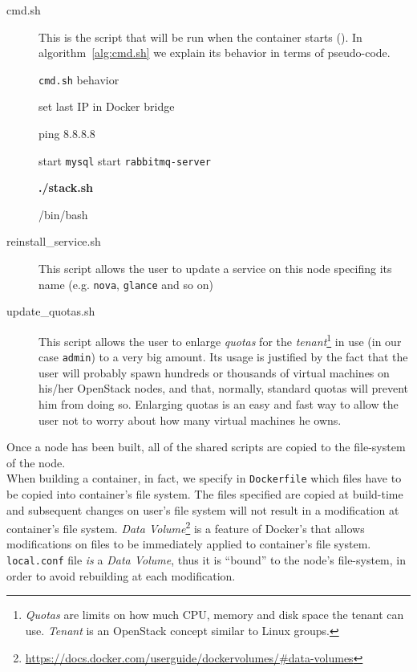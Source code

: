 \begin{description}
	\item[cmd.sh] This is the script that will be run when the container starts (). In algorithm~\ref{alg:cmd.sh} we explain its behavior in terms of pseudo-code.
	\begin{algorithm}[H]
	\caption{\texttt{cmd.sh} behavior}
	\label{alg:cmd.sh}
	\begin{algorithmic}[0]
			\State set last IP in Docker bridge 
		\EndIf

		\State ping 8.8.8.8 

			\State start \texttt{mysql}
			\State start \texttt{rabbitmq-server}
		\EndIf

		\State \textbf{./stack.sh} 

		\State /bin/bash 
	\end{algorithmic}
	\end{algorithm}
	
	\item[reinstall\_service.sh] This script allows the user to update a service on this node specifing its name (e.g. \texttt{nova}, \texttt{glance} and so on)

	\item[update\_quotas.sh] This script allows the user to enlarge \textit{quotas} for the \textit{tenant}\footnote{\textit{Quotas} are limits on how much CPU, memory and disk space the tenant can use. \textit{Tenant} is an OpenStack concept similar to Linux groups.} in use (in our case \texttt{admin}) to a very big amount. Its usage is justified by the fact that the user will probably spawn hundreds or thousands of virtual machines on his/her OpenStack nodes, and that, normally, standard quotas will prevent him from doing so. Enlarging quotas is an easy and fast way to allow the user not to worry about how many virtual machines he owns.
\end{description}

Once a node has been built, all of the shared scripts are copied to the file-system of the node.\\
When building a container, in fact, we specify in \texttt{Dockerfile} which files have to be copied into container's file system. The files specified are copied at build-time and subsequent changes on user's file system will not result in a modification at container's file system. \textit{Data Volume}\footnote{\url{https://docs.docker.com/userguide/dockervolumes/\#data-volumes}} is a feature of Docker's that allows modifications on files to be immediately applied to container's file system. \texttt{local.conf} file \emph{is} a \textit{Data Volume}, thus it is ``bound'' to the node's file-system, in order to avoid rebuilding at each modification.

